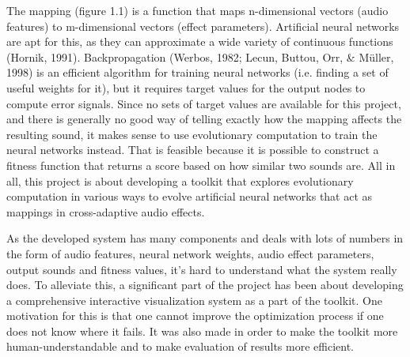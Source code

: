 The mapping (figure 1.1) is a function that maps n-dimensional vectors (audio features) to m-dimensional vectors (effect parameters). Artificial neural networks are apt for this, as they can approximate a wide variety of continuous functions (Hornik, 1991). Backpropagation (Werbos, 1982; Lecun, Buttou, Orr, \& Müller, 1998) is an efficient algorithm for training neural networks (i.e. finding a set of useful weights for it), but it requires target values for the output nodes to compute error signals. Since no sets of target values are available for this project, and there is generally no good way of telling exactly how the mapping affects the resulting sound, it makes sense to use evolutionary computation to train the neural networks instead. That is feasible because it is possible to construct a fitness function that returns a score based on how similar two sounds are. All in all, this project is about developing a toolkit that explores evolutionary computation in various ways to evolve artificial neural networks that act as mappings in cross-adaptive audio effects.

As the developed system has many components and deals with lots of numbers in the form of audio features, neural network weights, audio effect parameters, output sounds and fitness values, it’s hard to understand what the system really does. To alleviate this, a significant part of the project has been about developing a comprehensive interactive visualization system as a part of the toolkit. One motivation for this is that one cannot improve the optimization process if one does not know where it fails. It was also made in order to make the toolkit more human-understandable and to make evaluation of results more efficient.
